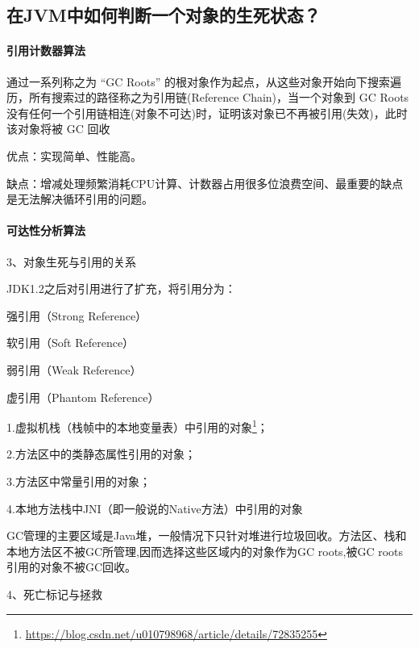 \documentclass[../../../interview-questions.tex]{subfiles}
\begin{document}
\subsection{在JVM中如何判断一个对象的生死状态？}

\paragraph{引用计数器算法}
通过一系列称之为 “GC Roots” 的根对象作为起点，从这些对象开始向下搜索遍历，所有搜索过的路径称之为引用链(Reference Chain)，当一个对象到 GC Roots 没有任何一个引用链相连(对象不可达)时，证明该对象已不再被引用(失效)，此时该对象将被 GC 回收

优点：实现简单、性能高。

缺点：增减处理频繁消耗CPU计算、计数器占用很多位浪费空间、最重要的缺点是无法解决循环引用的问题。

\paragraph{可达性分析算法}

3、对象生死与引用的关系

JDK1.2之后对引用进行了扩充，将引用分为：

强引用（Strong Reference）

软引用（Soft Reference）

弱引用（Weak Reference）

虚引用（Phantom Reference）

1.虚拟机栈（栈帧中的本地变量表）中引用的对象\footnote{\url{https://blog.csdn.net/u010798968/article/details/72835255}}；

2.方法区中的类静态属性引用的对象；

3.方法区中常量引用的对象；

4.本地方法栈中JNI（即一般说的Native方法）中引用的对象

GC管理的主要区域是Java堆，一般情况下只针对堆进行垃圾回收。方法区、栈和本地方法区不被GC所管理,因而选择这些区域内的对象作为GC roots,被GC roots引用的对象不被GC回收。


4、死亡标记与拯救
\end{document}
